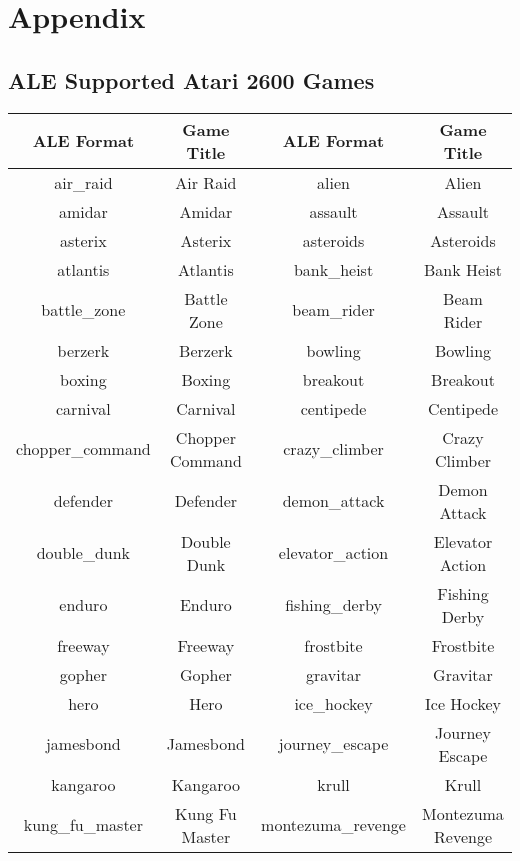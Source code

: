 \chapter{Appendix}
\section{ALE Supported Atari 2600 Games} \label{app:ALE_Games}
\begin{center}
    \begin{longtable}{ |c||c|c||c| }
        \hline
        ALE Format & Game Title & ALE Format & Game Title \\ [0.5ex] 
        \hline
        \hline
        air\_raid & Air Raid & alien & Alien\\ 
        \hline
        amidar & Amidar & assault & Assault\\ 
        \hline
        asterix & Asterix & asteroids & Asteroids\\ 
        \hline
        atlantis & Atlantis & bank\_heist & Bank Heist\\ 
        \hline
        battle\_zone & Battle Zone & beam\_rider & Beam Rider\\ 
        \hline
        berzerk & Berzerk & bowling & Bowling\\ 
        \hline
        boxing & Boxing & breakout & Breakout\\ 
        \hline
        carnival & Carnival & centipede & Centipede\\ 
        \hline
        chopper\_command & Chopper Command & crazy\_climber & Crazy Climber\\ 
        \hline
        defender & Defender & demon\_attack & Demon Attack\\ 
        \hline
        double\_dunk & Double Dunk & elevator\_action & Elevator Action\\ 
        \hline
        enduro & Enduro & fishing\_derby & Fishing Derby\\ 
        \hline
        freeway & Freeway & frostbite & Frostbite\\ 
        \hline
        gopher & Gopher & gravitar & Gravitar\\ 
        \hline
        hero & Hero & ice\_hockey & Ice Hockey\\ 
        \hline
        jamesbond & Jamesbond & journey\_escape & Journey Escape\\ 
        \hline
        kangaroo & Kangaroo & krull & Krull\\ 
        \hline
        kung\_fu\_master & Kung Fu Master & montezuma\_revenge & Montezuma Revenge\\ 

\end{longtable}
\end{center}
